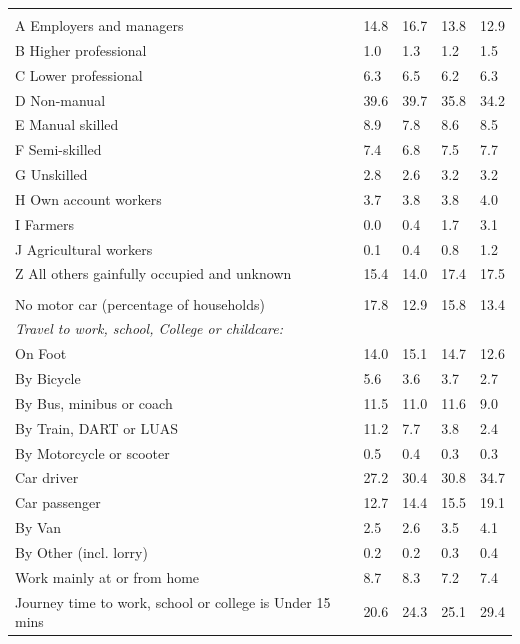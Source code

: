 \documentclass{article}
\begin{document}
\begin{table}[h]
\begin{tabular}{KTTTT}
\hline
    \\ 
    \hline
A Employers and managers & 14.8& 16.7& 13.8& 12.9\\
B Higher professional & 1.0& 1.3& 1.2& 1.5\\
C Lower professional & 6.3& 6.5& 6.2& 6.3\\
D Non-manual & 39.6& 39.7& 35.8& 34.2\\
E Manual skilled & 8.9& 7.8& 8.6& 8.5\\
F Semi-skilled & 7.4& 6.8& 7.5& 7.7\\
G Unskilled & 2.8& 2.6& 3.2& 3.2\\
H Own account workers & 3.7& 3.8& 3.8& 4.0\\
I Farmers & 0.0& 0.4& 1.7& 3.1\\
J Agricultural workers & 0.1& 0.4& 0.8& 1.2\\
Z All others gainfully occupied and unknown & 15.4& 14.0& 17.4& 17.5\\
\hline
{}\hline
    \\ 
    \hline
No motor car (percentage of households) & 17.8& 12.9& 15.8& 
13.4\\
    \hline 
\emph{Travel to work, school, College or childcare:} & & & \\
\quad On Foot & 14.0& 15.1& 14.7& 12.6\\ 
\quad By Bicycle & 5.6& 3.6& 3.7& 2.7\\ 
\quad By Bus, minibus or coach & 11.5& 11.0& 11.6&  9.0\\
\quad By Train, DART or LUAS & 11.2&  7.7&  3.8&  2.4\\
\quad By Motorcycle or scooter & 0.5& 0.4& 0.3& 0.3\\
\quad Car driver & 27.2 & 30.4& 30.8& 34.7\\
\quad Car passenger & 12.7& 14.4& 15.5& 19.1\\
\quad By Van & 2.5& 2.6& 3.5& 4.1\\
\quad By Other (incl. lorry) & 0.2& 0.2& 0.3& 0.4\\
    \hline
Work mainly at or from home & 8.7& 8.3& 7.2& 7.4\\
Journey time to work, school or college is Under 15 mins & 20.6& 24.3& 25.1& 29.4\\

\end{tabular}
\end{table}
\end{document}
